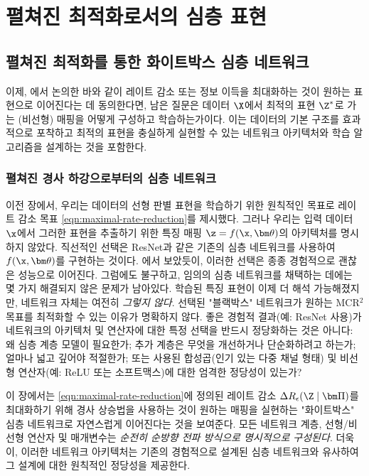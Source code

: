 \documentclass[../../book-main_ko.tex]{subfiles}
\begin{document}
\chapter{펼쳐진 최적화로서의 심층 표현}

\section{펼쳐진 최적화를 통한 화이트박스 심층 네트워크}\label{sec:chap4-white-box-model-via-unrolling}

이제, 에서 논의한 바와 같이 레이트 감소 또는 정보 이득을 최대화하는 것이 원하는 표현으로 이어진다는 데 동의한다면, 남은 질문은 데이터 $\X$에서 최적의 표현 $\Z^*$로 가는 (비선형) 매핑을 어떻게 구성하고 학습하는가이다. 이는 데이터의 기본 구조를 효과적으로 포착하고 최적의 표현을 충실하게 실현할 수 있는 네트워크 아키텍처와 학습 알고리즘을 설계하는 것을 포함한다.


\subsection{펼쳐진 경사 하강으로부터의 심층 네트워크}

이전 장에서, 우리는 데이터의 선형 판별 표현을 학습하기 위한 원칙적인 목표로 레이트 감소 목표 \eqref{eqn:maximal-rate-reduction}를 제시했다. 그러나 우리는 입력 데이터 $\x$에서 그러한 표현을 추출하기 위한 특징 매핑 $\z = f(\x, \bm \theta)$의 아키텍처를 명시하지 않았다. 
직선적인 선택은 ResNet과 같은 기존의 심층 네트워크를 사용하여 $f(\x, \bm \theta)$를 구현하는 것이다. 에서 보았듯이, 이러한 선택은 종종 경험적으로 괜찮은 성능으로 이어진다. 그럼에도 불구하고, 임의의 심층 네트워크를 채택하는 데에는 몇 가지 해결되지 않은 문제가 남아있다. 학습된 특징 표현이 이제 더 해석 가능해졌지만, 네트워크 자체는 여전히 {\em 그렇지 않다}. 선택된 "블랙박스" 네트워크가 원하는 MCR$^2$ 목표를 최적화할 수 있는 이유가 명확하지 않다. 좋은 경험적 결과(예: ResNet 사용)가 네트워크의 아키텍처 및 연산자에 대한 특정 선택을 반드시 정당화하는 것은 아니다: 왜 심층 계층 모델이 필요한가; 추가 계층은 무엇을 개선하거나 단순화하려고 하는가; 얼마나 넓고 깊어야 적절한가; 또는 사용된 합성곱(인기 있는 다중 채널 형태) 및 비선형 연산자(예: ReLU 또는 소프트맥스)에 대한 엄격한 정당성이 있는가? 

이 장에서는 \eqref{eqn:maximal-rate-reduction}에 정의된 레이트 감소 $\Delta R_{\epsilon}(\Z \mid \bm \Pi)$를 최대화하기 위해 경사 상승법을 사용하는 것이 원하는 매핑을 실현하는 "화이트박스" 심층 네트워크로 자연스럽게 이어진다는 것을 보여준다. 모든 네트워크 계층, 선형/비선형 연산자 및 매개변수는 {\em 순전히 순방향 전파 방식으로 명시적으로 구성된다}. 더욱이, 이러한 네트워크 아키텍처는 기존의 경험적으로 설계된 심층 네트워크와 유사하여 그 설계에 대한 원칙적인 정당성을 제공한다.
\end{document}
